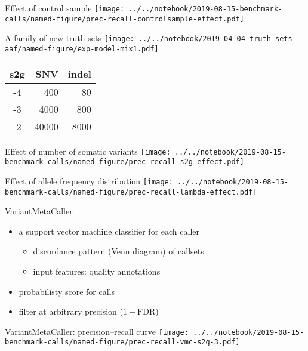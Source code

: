 \documentclass{beamer}
\begin{document}
\begin{frame}{Effect of control sample}
\texttt{[image: ../../notebook/2019-08-15-benchmark-calls/named-figure/prec-recall-controlsample-effect.pdf]}
\end{frame}

\begin{frame}{A family of new truth sets}
\texttt{[image: ../../notebook/2019-04-04-truth-sets-aaf/named-figure/exp-model-mix1.pdf]}
\footnotesize
\begin{tabular}{c|r|r}
s2g & SNV & indel \\
\hline
-4 & 400 & 80 \\
-3 & 4000 & 800 \\
-2 & 40000 & 8000 \\
\end{tabular}
\end{frame}

\begin{frame}{Effect of number of somatic variants}
\texttt{[image: ../../notebook/2019-08-15-benchmark-calls/named-figure/prec-recall-s2g-effect.pdf]}
\end{frame}

\begin{frame}{Effect of allele frequency distribution}
\texttt{[image: ../../notebook/2019-08-15-benchmark-calls/named-figure/prec-recall-lambda-effect.pdf]}
\end{frame}

\begin{frame}{VariantMetaCaller}
\begin{itemize}
\item a support vector machine classifier for each caller
\begin{itemize}
\item discordance pattern (Venn diagram) of callsets
\item input features: quality annotations 
\end{itemize}
\item probabilisty score for calls
\item filter at arbitrary precision (\(1-\mathrm{FDR}\))
\end{itemize}
\end{frame}

\begin{frame}[plain]{VariantMetaCaller: precision--recall curve}
\texttt{[image: ../../notebook/2019-08-15-benchmark-calls/named-figure/prec-recall-vmc-s2g-3.pdf]}
\end{frame}
\end{document}
